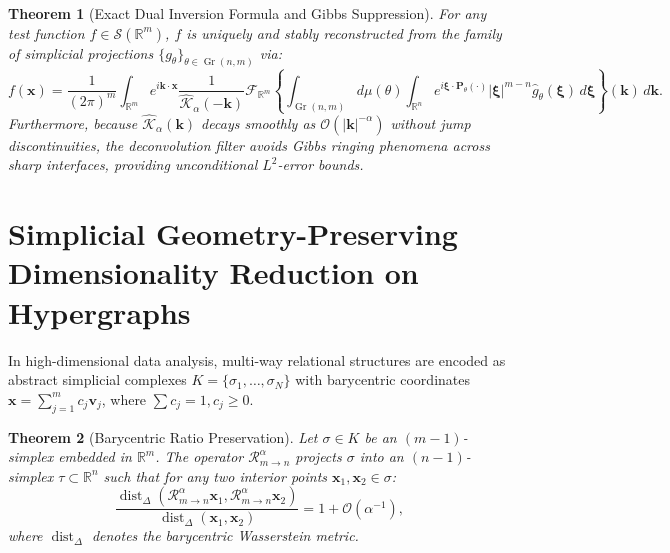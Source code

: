 \documentclass[11pt,a4paper]{article}
\theoremstyle{plain}
\newtheorem{theorem}{Theorem}[section]
\theoremstyle{definition}
\theoremstyle{remark}
\numberwithin{equation}{section}
\begin{document}
\begin{theorem}[Exact Dual Inversion Formula and Gibbs Suppression]
For any test function $f \in \mathcal{S}(\mathbb{R}^m)$, $f$ is uniquely and stably reconstructed from the family of simplicial projections $\{g_\theta\}_{\theta \in \operatorname{Gr}(n, m)}$ via:
\begin{equation}
f(\mathbf{x}) = \frac{1}{(2\pi)^m}\int_{\mathbb{R}^m} e^{i \mathbf{k}\cdot \mathbf{x}} \frac{1}{\widehat{\mathcal{K}}_\alpha(-\mathbf{k})} \mathcal{F}_{\mathbb{R}^m}\left\{ \int_{\operatorname{Gr}(n, m)} d\mu(\theta) \int_{\mathbb{R}^n} e^{i \boldsymbol{\xi}\cdot \mathbf{P}_\theta (\cdot)} |\boldsymbol{\xi}|^{m-n} \widehat{g}_\theta(\boldsymbol{\xi}) \, d\boldsymbol{\xi} \right\}(\mathbf{k}) \, d\mathbf{k}.
\end{equation}
Furthermore, because $\widehat{\mathcal{K}}_\alpha(\mathbf{k})$ decays smoothly as $\mathcal{O}(|\mathbf{k}|^{-\alpha})$ without jump discontinuities, the deconvolution filter avoids Gibbs ringing phenomena across sharp interfaces, providing unconditional $L^2$-error bounds.
\end{theorem}

\section{Simplicial Geometry-Preserving Dimensionality Reduction on Hypergraphs}

In high-dimensional data analysis, multi-way relational structures are encoded as abstract simplicial complexes $K = \{\sigma_1, \dots, \sigma_N\}$ with barycentric coordinates $\mathbf{x} = \sum_{j=1}^m c_j \mathbf{v}_j$, where $\sum c_j = 1, c_j \ge 0$.

\begin{theorem}[Barycentric Ratio Preservation]
Let $\sigma \in K$ be an $(m-1)$-simplex embedded in $\mathbb{R}^m$. The operator $\mathcal{R}_{m \to n}^\alpha$ projects $\sigma$ into an $(n-1)$-simplex $\tau \subset \mathbb{R}^n$ such that for any two interior points $\mathbf{x}_1, \mathbf{x}_2 \in \sigma$:
\begin{equation}
\frac{\operatorname{dist}_{\Delta}(\mathcal{R}_{m \to n}^\alpha \mathbf{x}_1, \mathcal{R}_{m \to n}^\alpha \mathbf{x}_2)}{\operatorname{dist}_{\Delta}(\mathbf{x}_1, \mathbf{x}_2)} = 1 + \mathcal{O}(\alpha^{-1}),
\end{equation}
where $\operatorname{dist}_{\Delta}$ denotes the barycentric Wasserstein metric.
\end{theorem}
\end{document}
